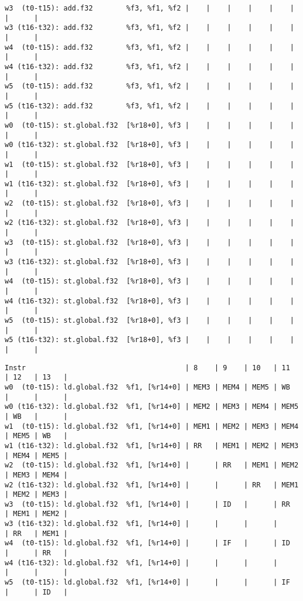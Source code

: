 \documentclass[11pt]{article}
\begin{document}
\begin{Answer}
\begin{verbatim}
w3  (t0-t15): add.f32        %f3, %f1, %f2 |    |    |    |    |    |      |      |
w3 (t16-t32): add.f32        %f3, %f1, %f2 |    |    |    |    |    |      |      |
w4  (t0-t15): add.f32        %f3, %f1, %f2 |    |    |    |    |    |      |      |
w4 (t16-t32): add.f32        %f3, %f1, %f2 |    |    |    |    |    |      |      |
w5  (t0-t15): add.f32        %f3, %f1, %f2 |    |    |    |    |    |      |      |
w5 (t16-t32): add.f32        %f3, %f1, %f2 |    |    |    |    |    |      |      |
w0  (t0-t15): st.global.f32  [%r18+0], %f3 |    |    |    |    |    |      |      |
w0 (t16-t32): st.global.f32  [%r18+0], %f3 |    |    |    |    |    |      |      |
w1  (t0-t15): st.global.f32  [%r18+0], %f3 |    |    |    |    |    |      |      |
w1 (t16-t32): st.global.f32  [%r18+0], %f3 |    |    |    |    |    |      |      |
w2  (t0-t15): st.global.f32  [%r18+0], %f3 |    |    |    |    |    |      |      |
w2 (t16-t32): st.global.f32  [%r18+0], %f3 |    |    |    |    |    |      |      |
w3  (t0-t15): st.global.f32  [%r18+0], %f3 |    |    |    |    |    |      |      |
w3 (t16-t32): st.global.f32  [%r18+0], %f3 |    |    |    |    |    |      |      |
w4  (t0-t15): st.global.f32  [%r18+0], %f3 |    |    |    |    |    |      |      |
w4 (t16-t32): st.global.f32  [%r18+0], %f3 |    |    |    |    |    |      |      |
w5  (t0-t15): st.global.f32  [%r18+0], %f3 |    |    |    |    |    |      |      |
w5 (t16-t32): st.global.f32  [%r18+0], %f3 |    |    |    |    |    |      |      |
\end{verbatim}
\newpage
\begin{verbatim}
Instr                                      | 8    | 9    | 10   | 11   | 12   | 13   |
w0  (t0-t15): ld.global.f32  %f1, [%r14+0] | MEM3 | MEM4 | MEM5 | WB   |      |      |
w0 (t16-t32): ld.global.f32  %f1, [%r14+0] | MEM2 | MEM3 | MEM4 | MEM5 | WB   |      |
w1  (t0-t15): ld.global.f32  %f1, [%r14+0] | MEM1 | MEM2 | MEM3 | MEM4 | MEM5 | WB   |
w1 (t16-t32): ld.global.f32  %f1, [%r14+0] | RR   | MEM1 | MEM2 | MEM3 | MEM4 | MEM5 |
w2  (t0-t15): ld.global.f32  %f1, [%r14+0] |      | RR   | MEM1 | MEM2 | MEM3 | MEM4 |
w2 (t16-t32): ld.global.f32  %f1, [%r14+0] |      |      | RR   | MEM1 | MEM2 | MEM3 |
w3  (t0-t15): ld.global.f32  %f1, [%r14+0] |      | ID   |      | RR   | MEM1 | MEM2 |
w3 (t16-t32): ld.global.f32  %f1, [%r14+0] |      |      |      |      | RR   | MEM1 |
w4  (t0-t15): ld.global.f32  %f1, [%r14+0] |      | IF   |      | ID   |      | RR   |
w4 (t16-t32): ld.global.f32  %f1, [%r14+0] |      |      |      |      |      |      |
w5  (t0-t15): ld.global.f32  %f1, [%r14+0] |      |      |      | IF   |      | ID   |

\end{verbatim}
\end{Answer}
\end{document}

